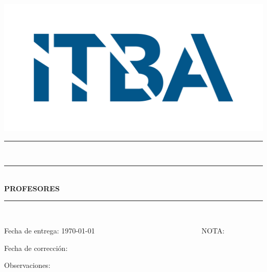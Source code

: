 \begin{titlepage}
    \begin{center}
        \includegraphics[width=0.4\linewidth]{imagenes/logoITBA.png}\\
         \vspace{-0.5cm}
        \textbf{\huge{\universidad}}
        
        \Large{\carrera}
        
         \vspace{-0.3cm}
        \LARGE{\materia}
        
        \vspace{-0.8cm}
        \rule{10cm}{0.01cm}\\
        \LARGE{\textbf{\unidad}}
        
        \vspace{-0.3cm}
        
        \Large{\titulo}
        
     \vspace{-0.3cm}
        \normalsize
        \rule{10cm}{0.01cm}\\
        \vspace{0.3cm}
        \autores
        \vspace{0.1cm}
        \textbf{PROFESORES}\\
        \profesores
        \rule{10cm}{0.01cm}\\
        
        
\end{center}
    \noindent
    \hspace{30pt}Fecha de entrega: \today ~~~~~~~~~~~~~~~~~~~~~~~~~~~~~ NOTA:
    
    \noindent
    \hspace{30pt}Fecha de corrección:
    
    \noindent
    \hspace{30pt}Observaciones: 
        
    
\end{titlepage}